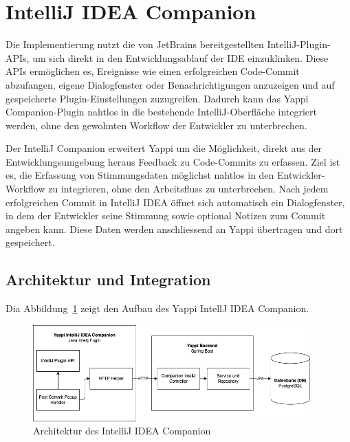 \documentclass[12pt,a4paper]{report}
\begin{document}
\tableofcontents
\newpage

\section{IntelliJ IDEA Companion}

Die Implementierung nutzt die von JetBrains bereitgestellten IntelliJ-Plugin-APIs, um sich direkt in den Entwicklungsablauf der IDE einzuklinken. Diese APIs ermöglichen es, Ereignisse wie einen erfolgreichen Code-Commit abzufangen, eigene Dialogfenster oder Benachrichtigungen anzuzeigen und auf gespeicherte Plugin-Einstellungen zuzugreifen. Dadurch kann das Yappi Companion-Plugin nahtlos in die bestehende IntelliJ-Oberfläche integriert werden, ohne den gewohnten Workflow der Entwickler zu unterbrechen.

Der IntelliJ Companion erweitert Yappi um die Möglichkeit, direkt aus der Entwicklungsumgebung heraus Feedback zu Code-Commits
zu erfassen. Ziel ist es, die Erfassung von Stimmungsdaten möglichst nahtlos in den Entwickler-Workflow zu integrieren, ohne den
Arbeitsfluss zu unterbrechen. Nach jedem erfolgreichen Commit in IntelliJ IDEA öffnet sich automatisch ein Dialogfenster, in dem
der Entwickler seine Stimmung sowie optional Notizen zum Commit angeben kann. Diese Daten werden anschliessend an Yappi übertragen
und dort gespeichert.

\subsection{Architektur und Integration}

Dia Abbildung~\ref{fig:intellij-system-diagram} zeigt den Aufbau des Yappi IntellJ IDEA Companion.

\begin{figure}[H]
\centering
\includegraphics[width=0.95\textwidth]{../figures/intellij-system-diagram.drawio.png}
\caption{Architektur des IntelliJ IDEA Companion}
\label{fig:intellij-system-diagram}
\end{figure}
\end{document}
